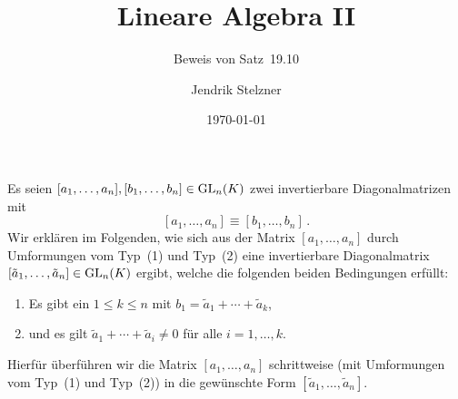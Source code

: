 \documentclass[a4paper,10pt,numbers = noenddot]{scrartcl}
\title{Lineare Algebra II}
\subtitle{Beweis von Satz~19.10}
\author{Jendrik Stelzner}
\date{\today}
\begin{document}
\maketitle


Es seien $[a_1, \dotsc, a_n], [b_1, \dotsc, b_n] \in \operatorname{GL}_{n}(K)$ zwei invertierbare Diagonalmatrizen mit
\[
          [a_1, \dotsc, a_n]
  \equiv  [b_1, \dotsc, b_n] \,.
\]
Wir erklären im Folgenden, wie sich aus der Matrix $[a_1, \dotsc, a_n]$ durch Umformungen vom Typ~(1) und Typ~(2) eine invertierbare Diagonalmatrix $[\tilde{a}_1, \dotsc, \tilde{a}_n] \in \operatorname{GL}_{n}(K)$ ergibt, welche die folgenden beiden Bedingungen erfüllt:
\begin{enumerate}[label = \alph*)]
  \item
    \label{enumerate: b1 is sum}
    Es gibt ein $1 \leq k \leq n$ mit $b_1 = \tilde{a}_1 + \dotsb + \tilde{a}_k$,
  \item
    \label{enumerate: leading sums are nonzero}
    und es gilt $\tilde{a}_1 + \dotsb + \tilde{a}_i \neq 0$ für alle $i = 1, \dotsc, k$.
\end{enumerate}

Hierfür überführen wir die Matrix $[a_1, \dotsc, a_n]$ schrittweise (mit Umformungen vom Typ~(1) und Typ~(2)) in die gewünschte Form $[\tilde{a}_1, \dotsc, \tilde{a}_n]$.
\end{document}
